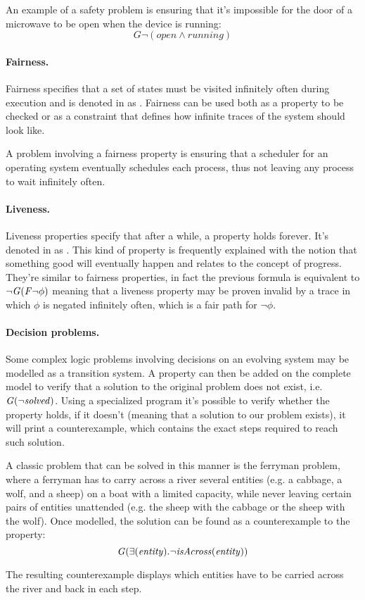 An example of a safety problem is ensuring that it's impossible for the door of a microwave to be open when the device is running:
\[
    G \lnot (\mathit{open} \land \mathit{running})
\]

\paragraph*{Fairness.} Fairness specifies that a set of states must be visited infinitely often during execution and is denoted in \ltl{} as \ffair{}.
Fairness can be used both as a property to be checked or as a constraint that defines how infinite traces of the system should look like.

A problem involving a fairness property is ensuring that a scheduler for an operating system eventually schedules each process, thus not leaving any process to wait infinitely often.

\paragraph*{Liveness.} Liveness properties specify that after a while, a property holds forever. It's denoted in \ltl{} as \flive{}.
This kind of property is frequently explained with the notion that something good will eventually happen and relates to the concept of progress.
They're similar to fairness properties, in fact the previous formula is equivalent to $\lnot \mathit{G}(\mathit{F} \lnot \phi)$ meaning that a liveness property may be proven invalid by a trace in which $\phi$ is negated infinitely often, which is a fair path for $\lnot \phi$.

\paragraph*{Decision problems.} Some complex logic problems involving decisions on an evolving system may be modelled as a transition system.
A property can then be added on the complete model to verify that a solution to the original problem does not exist, i.e. $\mathit{G} (\lnot \mathit{solved})$.
Using a specialized program it's possible to verify whether the property holds, if it doesn't (meaning that a solution to our problem exists), it will print a counterexample, which contains the exact steps required to reach such solution.

A classic problem that can be solved in this manner is the ferryman problem, where a ferryman has to carry across a river several entities (e.g. a cabbage, a wolf, and a sheep) on a boat with a limited capacity, while never leaving certain pairs of entities unattended (e.g. the sheep with the cabbage or the sheep with the wolf).
Once modelled, the solution can be found as a counterexample to the property:
\[
    \mathit{G} (\exists (\mathit{entity}). \lnot \mathit{isAcross}(\mathit{entity}))
\]

The resulting counterexample displays which entities have to be carried across the river and back in each step.


